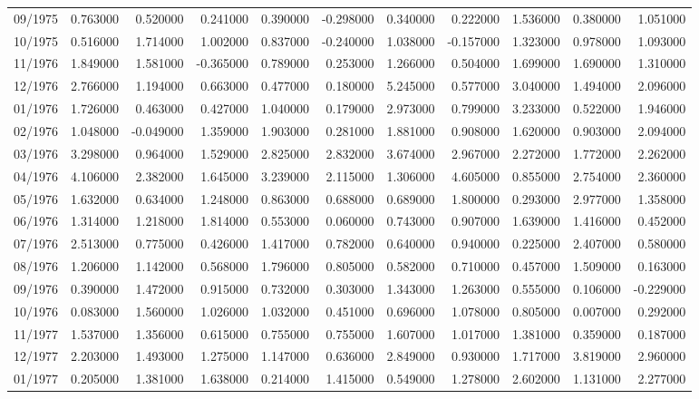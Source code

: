 \begin{tabular}{lrrrrrrrrrr}
09/1975 & 0.763000 & 0.520000 & 0.241000 & 0.390000 & -0.298000 & 0.340000 & 0.222000 & 1.536000 & 0.380000 & 1.051000 \\
10/1975 & 0.516000 & 1.714000 & 1.002000 & 0.837000 & -0.240000 & 1.038000 & -0.157000 & 1.323000 & 0.978000 & 1.093000 \\
11/1976 & 1.849000 & 1.581000 & -0.365000 & 0.789000 & 0.253000 & 1.266000 & 0.504000 & 1.699000 & 1.690000 & 1.310000 \\
12/1976 & 2.766000 & 1.194000 & 0.663000 & 0.477000 & 0.180000 & 5.245000 & 0.577000 & 3.040000 & 1.494000 & 2.096000 \\
01/1976 & 1.726000 & 0.463000 & 0.427000 & 1.040000 & 0.179000 & 2.973000 & 0.799000 & 3.233000 & 0.522000 & 1.946000 \\
02/1976 & 1.048000 & -0.049000 & 1.359000 & 1.903000 & 0.281000 & 1.881000 & 0.908000 & 1.620000 & 0.903000 & 2.094000 \\
03/1976 & 3.298000 & 0.964000 & 1.529000 & 2.825000 & 2.832000 & 3.674000 & 2.967000 & 2.272000 & 1.772000 & 2.262000 \\
04/1976 & 4.106000 & 2.382000 & 1.645000 & 3.239000 & 2.115000 & 1.306000 & 4.605000 & 0.855000 & 2.754000 & 2.360000 \\
05/1976 & 1.632000 & 0.634000 & 1.248000 & 0.863000 & 0.688000 & 0.689000 & 1.800000 & 0.293000 & 2.977000 & 1.358000 \\
06/1976 & 1.314000 & 1.218000 & 1.814000 & 0.553000 & 0.060000 & 0.743000 & 0.907000 & 1.639000 & 1.416000 & 0.452000 \\
07/1976 & 2.513000 & 0.775000 & 0.426000 & 1.417000 & 0.782000 & 0.640000 & 0.940000 & 0.225000 & 2.407000 & 0.580000 \\
08/1976 & 1.206000 & 1.142000 & 0.568000 & 1.796000 & 0.805000 & 0.582000 & 0.710000 & 0.457000 & 1.509000 & 0.163000 \\
09/1976 & 0.390000 & 1.472000 & 0.915000 & 0.732000 & 0.303000 & 1.343000 & 1.263000 & 0.555000 & 0.106000 & -0.229000 \\
10/1976 & 0.083000 & 1.560000 & 1.026000 & 1.032000 & 0.451000 & 0.696000 & 1.078000 & 0.805000 & 0.007000 & 0.292000 \\
11/1977 & 1.537000 & 1.356000 & 0.615000 & 0.755000 & 0.755000 & 1.607000 & 1.017000 & 1.381000 & 0.359000 & 0.187000 \\
12/1977 & 2.203000 & 1.493000 & 1.275000 & 1.147000 & 0.636000 & 2.849000 & 0.930000 & 1.717000 & 3.819000 & 2.960000 \\
01/1977 & 0.205000 & 1.381000 & 1.638000 & 0.214000 & 1.415000 & 0.549000 & 1.278000 & 2.602000 & 1.131000 & 2.277000 \\

\end{tabular}
